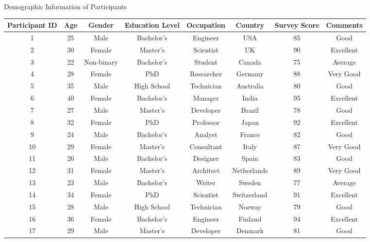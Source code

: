 \begin{landscape}
    \begin{center}
        \begin{threeparttable}[htbp]
            \caption{Demographic Information of Participants}
            \label{tab:participants-landscape}
            \begin{tabular}{cccccccc}
                \toprule
                    Participant ID & Age & Gender & Education Level & Occupation & Country & Survey Score & Comments \\
                \midrule
                    1 & 25 & Male & Bachelor's & Engineer & USA & 85 & Good \\
                    2 & 30 & Female & Master's & Scientist & UK & 90 & Excellent \\
                    3 & 22 & Non-binary & Bachelor's & Student & Canada & 75 & Average \\
                    4 & 28 & Female & PhD & Researcher & Germany & 88 & Very Good \\
                    5 & 35 & Male & High School & Technician & Australia & 80 & Good \\
                    6 & 40 & Female & Bachelor's & Manager & India & 95 & Excellent \\
                    7 & 27 & Male & Master's & Developer & Brazil & 78 & Good \\
                    8 & 32 & Female & PhD & Professor & Japan & 92 & Excellent \\
                    9 & 24 & Male & Bachelor's & Analyst & France & 82 & Good \\
                    10 & 29 & Female & Master's & Consultant & Italy & 87 & Very Good \\
                    11 & 26 & Male & Bachelor's & Designer & Spain & 83 & Good \\
                    12 & 31 & Female & Master's & Architect & Netherlands & 89 & Very Good \\
                    13 & 23 & Male & Bachelor's & Writer & Sweden & 77 & Average \\
                    14 & 34 & Female & PhD & Scientist & Switzerland & 91 & Excellent \\
                    15 & 28 & Male & High School & Technician & Norway & 79 & Good \\
                    16 & 36 & Female & Bachelor's & Engineer & Finland & 94 & Excellent \\
                    17 & 29 & Male & Master's & Developer & Denmark & 81 & Good \\
                \bottomrule
            \end{tabular}
        \end{threeparttable}
    \end{center}
\end{landscape}
